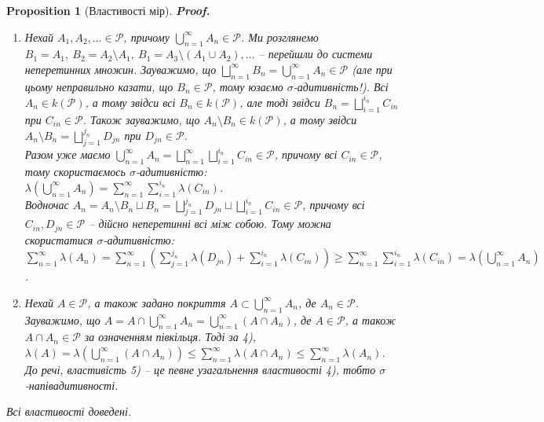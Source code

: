 \documentclass[a4paper, 10pt]{article}
\makeatletter
\theoremstyle{theoremdd}
\newtheorem{proposition}[theorem]{Proposition}
\renewenvironment{proof}[1][Proof.\\]{\par
\pushQED{\hfill \qed}%
\normalfont \topsep6\p@\@plus6\p@\relax
\trivlist
\item\relax
{\bfseries
#1\@addpunct{.}}\hspace\labelsep\ignorespaces
}{%
\popQED\endtrivlist\@endpefalse
}
\makeatother
\begin{document}
\begin{proposition}[Властивості мір]
\begin{proof}
\begin{enumerate}[wide=0pt, label={\arabic*)}]
\item Нехай $A_1,A_2,\dots \in \mathcal{P}$, причому $\displaystyle\bigcup_{n=1}^\infty A_n \in \mathcal{P}$. Ми розглянемо $B_1 = A_1,\ B_2 = A_2 \setminus A_1,\ B_1 = A_3 \setminus (A_1 \cup A_2), \dots$ -- перейшли до системи неперетинних множин. Зауважимо, що $\displaystyle\bigsqcup_{n=1}^\infty B_n = \bigcup_{n=1}^\infty A_n \in \mathcal{P}$ (але при цьому неправильно казати, що $B_n \in \mathcal{P}$, тому юзаємо $\sigma$-адитивність!). Всі $A_n \in k(\mathcal{P})$, а тому звідси всі $B_n \in k(\mathcal{P})$, але тоді звідси $B_n = \displaystyle\bigsqcup_{i=1}^{i_n} C_{in}$ при $C_{in} \in \mathcal{P}$. Також зауважимо, що $A_n \setminus B_n \in k(\mathcal{P})$, а тому звідси $A_n \setminus B_n = \displaystyle\bigsqcup_{j=1}^{j_n} D_{jn}$ при $D_{jn} \in \mathcal{P}$.\\
Разом уже маємо $\displaystyle\bigcup_{n=1}^\infty A_n = \bigsqcup_{n=1}^\infty \bigsqcup_{i=1}^{i_n} C_{in} \in \mathcal{P}$, причому всі $C_{in} \in \mathcal{P}$, тому скористаємось $\sigma$-адитивністю:\\
$\displaystyle\lambda\left( \bigcup_{n=1}^\infty A_n \right) = \sum_{n=1}^\infty \sum_{i=1}^{i_n} \lambda(C_{in})$.\\
Водночас $A_n = A_n \setminus B_n \sqcup B_n = \displaystyle\bigsqcup_{j=1}^{j_n} D_{jn} \sqcup \bigsqcup_{i=1}^{i_n} C_{in} \in \mathcal{P}$, причому всі $C_{in},D_{jn} \in \mathcal{P}$ -- дійсно неперетинні всі між собою. Тому можна скористатися $\sigma$-адитивністю:\\
$\displaystyle\sum_{n=1}^\infty \lambda(A_n) = \sum_{n=1}^\infty \left( \sum_{j=1}^{j_n} \lambda(D_{jn}) + \sum_{i=1}^{i_n} \lambda(C_{in}) \right) \geq \sum_{n=1}^\infty \sum_{i=1}^{i_n} \lambda(C_{in}) = \lambda\left( \bigcup_{n=1}^\infty A_n \right)$.

\item Нехай $A \in \mathcal{P}$, а також задано покриття $A \subset \displaystyle\bigcup_{n=1}^\infty A_n$, де $A_n \in \mathcal{P}$. Зауважимо, що $A = A \cap \displaystyle\bigcup_{n=1}^\infty A_n = \bigcup_{n=1}^\infty (A \cap A_n)$, де $A \in \mathcal{P}$, а також $A \cap A_n \in \mathcal{P}$ за означенням півкільця. Тоді за 4),\\
$\displaystyle\lambda(A) = \lambda\left( \bigcup_{n=1}^\infty (A \cap A_n) \right) \leq \sum_{n=1}^\infty \lambda(A \cap A_n) \leq \sum_{n=1}^\infty \lambda(A_n)$.\\
\textit{До речі, властивість 5) -- це певне узагальнення властивості 4), тобто $\sigma$-напівадитивності.}
\end{enumerate} 
Всі властивості доведені.
\end{proof}
\end{proposition}
\end{document}
